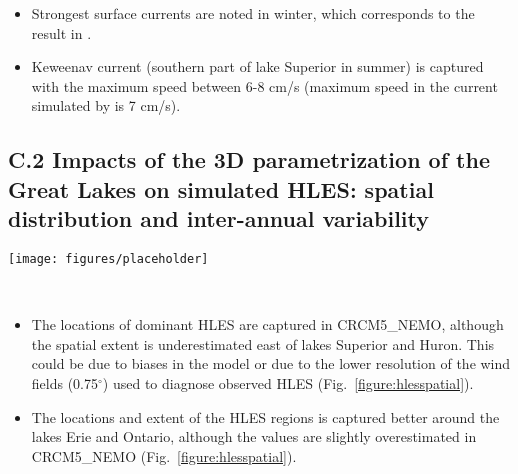 \documentclass[a0b,landscape]{a0poster}
\begin{document}
\begin{multicols*}{4}
\noindent
{}
\begin{itemize}
  \item Strongest surface currents are noted in winter, which corresponds to the result in \citet{dupont2012}.
  \item Keweenav current (southern part of lake Superior in summer) is captured with the maximum speed
  between 6-8 cm/s (maximum speed in the current simulated by \citet{dupont2012} is 7 cm/s).
\end{itemize}


\subsection*{C.2 Impacts of the 3D parametrization of the Great Lakes on simulated HLES: spatial distribution and inter-annual variability}
\noindent
\begin{minipage}{\linewidth}
  \center
  \texttt{[image: figures/placeholder]}
\end{minipage} \\[0.5cm]


\begin{itemize}
  \item The locations of dominant HLES are captured in CRCM5\_NEMO, although the spatial extent is underestimated east of lakes Superior and Huron.
        This could be due to biases in the model or due to the lower resolution of the wind fields (0.75$^\circ$) used to diagnose observed HLES (Fig.~\ref{figure:hlesspatial}).
  \item The locations and extent of the HLES regions is captured better around the lakes Erie and Ontario, although the values are slightly overestimated in
        CRCM5\_NEMO (Fig.~\ref{figure:hlesspatial}).
\end{itemize}



%
\hfill
%



\end{multicols*}
\end{document}
